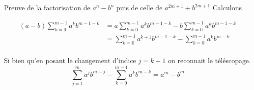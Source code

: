 \documentclass{article}
\renewenvironment{question_kholle}[2][ ]
{
	\subsection{\texorpdfstring{#2}{}}
	\notblank{#1}
	{
		\noindent #1
		\bigbreak
	}
	{}
	\begin{proof}
}
{
	\end{proof}
}
\begin{document}
\begin{question_kholle}{Preuve de la factorisation de $a^n - b^n$ puis de celle de $a^{2m+1} + b^{2m+1} $}
    Calculons 
    
    \begin{align*}
        (a-b)\sum_{k=0}^{m-1}a^{k}b^{m-1-k} 
        &=a \sum_{k=0}^{m-1}a^{k}b^{m-1-k} -b \sum_{k=0}^{m-1}a^{k}b^{m-1-k} \\
        &= \sum_{k=0}^{m-1}a^{k+1}b^{m-1-k} - \sum_{k=0}^{m-1}a^{k}b^{m-k} \\
    \end{align*}
    
    Si bien qu'en posant le changement d'indice $j = k + 1$ on reconnait le téléscopage.
    $$
    \sum_{j=1}^{m}a^{j}b^{m-j} - \sum_{k=0}^{m-1}a^{k}b^{m-k} = a^{m} - b ^{m}
    $$
\end{question_kholle}
\end{document}
